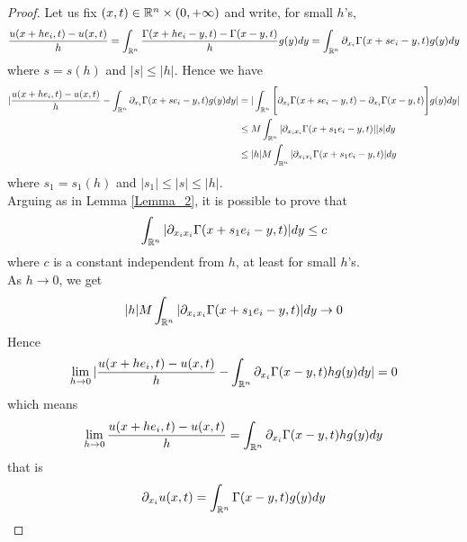\begin{ProofBox}
    \begin{proof}
        Let us fix $(x,t) \in \mathbb{R}^n \times (0,+\infty)$ and write, for small $h$'s,
        \begin{equation*}
            \frac{u(x+he_i,t) - u(x,t)}{h} = \int_{\mathbb{R}^n} \frac{\Gamma(x+he_i-y,t) - \Gamma(x-y,t)}{h} g(y) dy = \int_{\mathbb{R}^n} \partial_{x_i} \Gamma(x+se_i - y, t) g(y) dy
        \end{equation*}
        where $s = s(h)$ and $|s| \leq |h|$. Hence we have
        \begin{align*}
            |\frac{u(x+he_i,t) - u(x,t)}{h} - \int_{\mathbb{R}^n} \partial_{x_i} \Gamma(x+se_i - y, t) g(y) dy| &= |\int_{\mathbb{R}^n}  \Bigg[ \partial_{x_i} \Gamma(x+se_i - y, t) - \partial_{x_i} \Gamma(x - y, t)\Bigg] g(y) dy| \\
            &\leq M \int_{\mathbb{R}^n} |\partial_{x_ix_i} \Gamma(x+s_1 e_i - y,t)| |s| dy \\
            & \leq |h| M \int_{\mathbb{R}^n} |\partial_{x_ix_i} \Gamma(x+s_1 e_i - y,t)| dy
        \end{align*}
        where $s_1 = s_1 (h)$ and $|s_1| \leq |s| \leq |h|$. \\
        Arguing as in Lemma \ref{Lemma_2}, it is possible to prove that 
        \begin{equation*}
            \int_{\mathbb{R}^n} |\partial_{x_ix_i} \Gamma(x+s_1 e_i - y,t)| dy \leq c
        \end{equation*}
        where $c$ is a constant independent from $h$, at least for small $h$'s. \\
        As $h \rightarrow 0$, we get 
        \begin{equation*}
            |h| M \int_{\mathbb{R}^n} |\partial_{x_ix_i} \Gamma(x+s_1 e_i - y,t)| dy \rightarrow 0
        \end{equation*}
        Hence
        \begin{equation*}
            \lim_{h \rightarrow 0} |\frac{u(x+he_i,t) - u(x,t)}{h} - \int_{\mathbb{R}^n} \partial_{x_i} \Gamma(x-y,t){h} g(y)dy | = 0
        \end{equation*}
        which means 
        \begin{equation*}
            \lim_{h \rightarrow 0} \frac{u(x+he_i,t) - u(x,t)}{h} = \int_{\mathbb{R}^n} \partial_{x_i} \Gamma(x-y,t){h} g(y)dy
        \end{equation*}
        that is 
        \begin{equation*}
            \partial_{x_i} u(x,t) = \int_{\mathbb{R}^n} \Gamma(x-y,t) g(y) dy
        \end{equation*}
    \end{proof}
\end{ProofBox}


